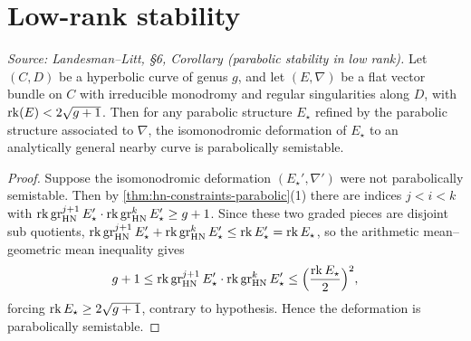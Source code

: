 \section{Low-rank stability}

\begin{corollary}
  \label{cor:stable-parabolic}
  \textit{Source: Landesman--Litt, \S6, Corollary (parabolic stability in low rank).}
  Let $(C, D)$ be a hyperbolic curve of genus $g$, and let $(E, \nabla)$ be a flat
  vector bundle on $C$ with irreducible monodromy and regular singularities along
  $D$, with $\operatorname{rk}(E) < 2\sqrt{g+1}$. Then for any parabolic structure $E_\star$
  refined by the parabolic structure associated to $\nabla$, the isomonodromic
  deformation of $E_\star$ to an analytically general nearby curve is parabolically
  semistable.
\end{corollary}

\begin{proof}
  Suppose the isomonodromic deformation $(E_\star', \nabla')$ were not parabolically
  semistable. Then by \cref{thm:hn-constraints-parabolic}(1) there are indices
  $j < i < k$ with
  $\operatorname{rk} \operatorname{gr}^{j+1}_{\mathrm{HN}} E_\star' \cdot \operatorname{rk} \operatorname{gr}^k_{\mathrm{HN}} E_\star' \geq g + 1$. Since
  these two graded pieces are disjoint sub quotients,
  $\operatorname{rk} \operatorname{gr}^{j+1}_{\mathrm{HN}} E_\star' + \operatorname{rk} \operatorname{gr}^k_{\mathrm{HN}} E_\star' \leq \operatorname{rk} E_\star' =
  \operatorname{rk} E_\star$, so the arithmetic mean--geometric mean inequality gives
  \[
    g + 1 \leq \operatorname{rk} \operatorname{gr}^{j+1}_{\mathrm{HN}} E_\star' \cdot \operatorname{rk} \operatorname{gr}^k_{\mathrm{HN}} E_\star'
      \leq \Big( \frac{\operatorname{rk} E_\star}{2} \Big)^2,
  \]
  forcing $\operatorname{rk} E_\star \geq 2\sqrt{g+1}$, contrary to hypothesis. Hence the
  deformation is parabolically semistable.
\end{proof}

